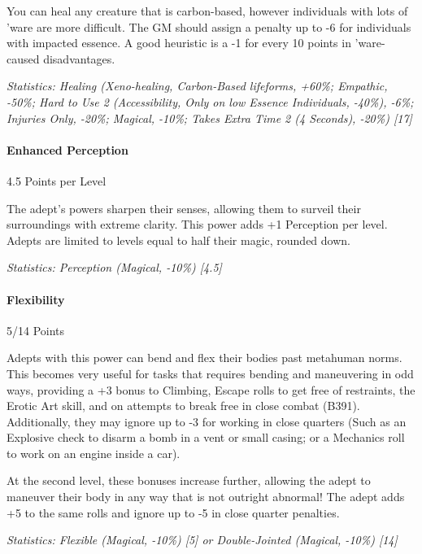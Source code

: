 \begin{multicols*}{3}
	You can heal any creature that is carbon-based, however individuals with lots of 'ware are more difficult. The GM should assign a penalty up to -6 for individuals with impacted essence. A good heuristic is a -1 for every 10 points in 'ware-caused disadvantages.

	\textcolor{OliveGreen}{\textit{Statistics: Healing (Xeno-healing, Carbon-Based lifeforms, +60\%; Empathic, -50\%; Hard to Use 2 (Accessibility, Only on low Essence Individuals, -40\%), -6\%; Injuries Only, -20\%; Magical, -10\%; Takes Extra Time 2 (4 Seconds), -20\%) [17] }}
	
	\paragraph{Enhanced Perception}
	\begin{flushright}
		4.5 Points per Level
	\end{flushright}

	The adept's powers sharpen their senses, allowing them to surveil their surroundings with extreme clarity. This power adds +1 Perception per level. Adepts are limited to levels equal to half their magic, rounded down.

	\textcolor{OliveGreen}{\textit{Statistics: Perception (Magical, -10\%) [4.5] }}
	
	\paragraph{Flexibility}
	\begin{flushright}
		5/14 Points
	\end{flushright}

	Adepts with this power can bend and flex their bodies past metahuman norms. This becomes very useful for tasks that requires bending and maneuvering in odd ways, providing a +3 bonus to Climbing, Escape rolls to get free of restraints, the Erotic Art skill, and on attempts to break free in close combat (B391). Additionally, they may ignore up to -3 for working in close quarters (Such as an Explosive check to disarm a bomb in a vent or small casing; or a Mechanics roll to work on an engine inside a car).
	
	At the second level, these bonuses increase further, allowing the adept to maneuver their body in any way that is not outright abnormal! The adept adds +5 to the same rolls and ignore up to -5 in close quarter penalties.

	\textcolor{OliveGreen}{\textit{Statistics: Flexible (Magical, -10\%) [5] or Double-Jointed (Magical, -10\%) [14] }}


\end{multicols*}
